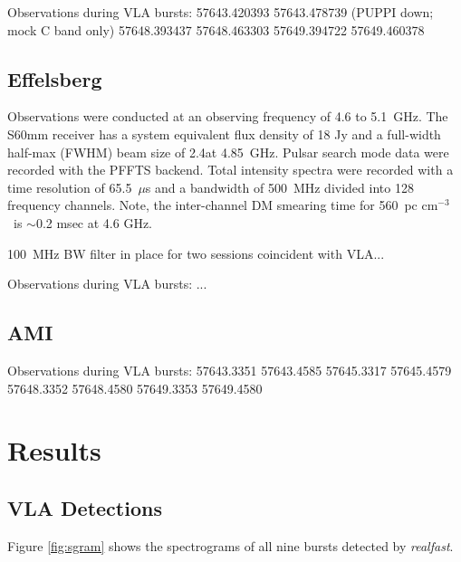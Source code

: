 \documentclass{emulateapj}
\newcommand{\rf}{\emph{realfast}}
\begin{document}
Observations during VLA bursts:
57643.420393  57643.478739 (PUPPI down; mock C band only)
57648.393437  57648.463303
57649.394722  57649.460378

\subsection{Effelsberg}

Observations were conducted at an observing frequency of 4.6 to 5.1~GHz. The S60mm receiver has a system equivalent flux density of 18 Jy and a full-width half-max (FWHM) beam size of 2.4\arcmin at 4.85~GHz. Pulsar search mode data were recorded with the PFFTS backend. Total intensity spectra were recorded with a time resolution of 65.5~$\mu$s and a bandwidth of 500~MHz divided into 128 frequency channels. Note, the inter-channel DM smearing time for 560~pc cm$^{-3}$\ is $\sim$0.2 msec at 4.6 GHz.

100~MHz BW filter in place for two sessions coincident with VLA...

Observations during VLA bursts:
...

\subsection{AMI}

Observations during VLA bursts:
57643.3351  57643.4585
57645.3317  57645.4579
57648.3352  57648.4580
57649.3353  57649.4580

\section{Results}

\subsection{VLA Detections}

Figure \ref{fig:sgram} shows the spectrograms of all nine bursts detected by \rf.
\end{document}
